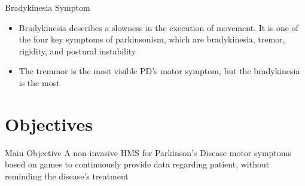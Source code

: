 \documentclass{beamer}
\begin{document}
\begin{frame}{}
  \begin{block}{Bradykinesia Symptom}
      \begin{itemize}
				\item Bradykinesia describes a slowness in the execution of movement. It is one of the four key symptoms of parkinsonism, which are bradykinesia, tremor, rigidity, and postural instability
				\item The tremmor is the most visible PD's motor symptom, but the bradykinesia is the most
	\end{itemize}
  \end{block}
\end{frame}
  


\section{Objectives}
\begin{frame}
		 \begin{block}{Main Objective}
				A non-invasive HMS for Parkinson's Disease motor symptoms based on games to continuously provide data regarding patient, without reminding the disease's treatment
		 \end{block}
     \begin{block}{}
     \begin{center}		
		
      \end{center}
    \end{block}
\end{frame}

\end{document}
